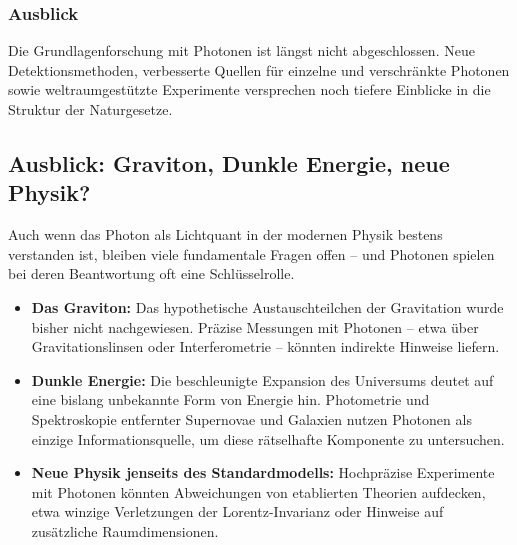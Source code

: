 \subsubsection{Ausblick}

Die Grundlagenforschung mit Photonen ist längst nicht abgeschlossen. 
Neue Detektionsmethoden, verbesserte Quellen für einzelne und verschränkte Photonen sowie weltraumgestützte Experimente versprechen noch tiefere Einblicke in die Struktur der Naturgesetze.

\subsection{Ausblick: Graviton, Dunkle Energie, neue  Physik?}

Auch wenn das Photon als Lichtquant in der modernen Physik bestens verstanden ist, bleiben viele fundamentale Fragen offen – und Photonen spielen bei deren Beantwortung oft eine Schlüsselrolle.

\begin{itemize}
	\item \textbf{Das Graviton:} Das hypothetische Austauschteilchen der Gravitation wurde bisher nicht nachgewiesen. 
	Präzise Messungen mit Photonen – etwa über Gravitationslinsen oder Interferometrie – könnten indirekte Hinweise liefern.
	\item \textbf{Dunkle Energie:} Die beschleunigte Expansion des Universums deutet auf eine bislang unbekannte Form von Energie hin. 
	Photometrie und Spektroskopie entfernter Supernovae und Galaxien nutzen Photonen als einzige Informationsquelle, um diese rätselhafte Komponente zu untersuchen.
	\item \textbf{Neue Physik jenseits des Standardmodells:} Hochpräzise Experimente mit Photonen könnten Abweichungen von etablierten Theorien aufdecken, etwa winzige Verletzungen der Lorentz-Invarianz oder Hinweise auf zusätzliche Raumdimensionen.
\end{itemize}

